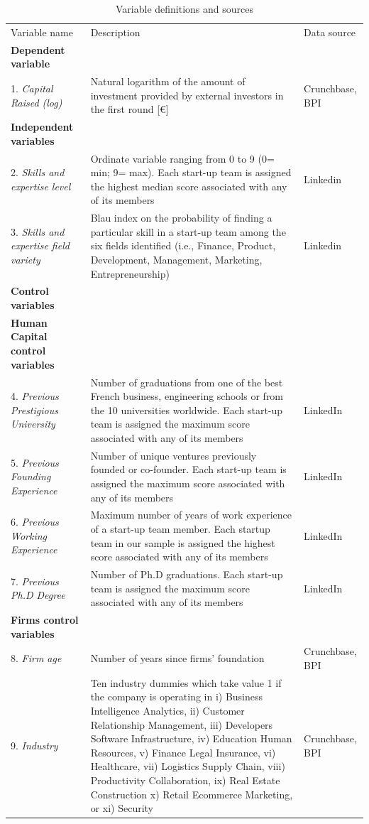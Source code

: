 \documentclass[12pt]{article}
\begin{document}

\begin{table} [ht]
\caption{Variable definitions and sources}
\scriptsize
\renewcommand{\arraystretch}{1.5}
\begin{tabularx}{\textwidth}{ p{5cm} p{7cm} p{2.2cm} }
\toprule
\multicolumn{1}{l}{Variable name}&\multicolumn{1}{l}{Description}&\multicolumn{1}{l}{Data source}\\
\cmidrule(r){1-3}
\textbf{Dependent variable}& &\\
1. \textit{Capital Raised (log)} & Natural logarithm of the amount of investment provided by external investors in the first round [€] & Crunchbase, BPI \\
\textbf{Independent variables}& &\\
2. \textit{Skills and expertise level} & Ordinate variable ranging from 0 to 9 (0= min; 9= max). Each start-up team is assigned the highest median score associated with any of its members & Linkedin\\
3. \textit{Skills and expertise field variety} & Blau index on the probability of finding a particular skill in a start-up team among the six fields identified (i.e., Finance, Product, Development, Management, Marketing, Entrepreneurship) & Linkedin \\
\textbf{Control variables}& &\\
\textbf{Human Capital control variables}& &\\
4. \textit{Previous Prestigious University} & Number of graduations from one of the best French business, engineering schools or from the 10 universities worldwide. Each start-up team is assigned the maximum score associated with any of its members & LinkedIn\\
5. \textit{Previous Founding Experience} & Number of unique ventures previously founded or co-founder. Each start-up team is assigned the maximum score associated with any of its members & LinkedIn\\
6. \textit{Previous Working Experience} & Maximum number of years of work experience of a start-up team member. Each startup team in our sample is assigned the highest score associated with any of its members & LinkedIn\\
7. \textit{Previous Ph.D Degree} & Number of Ph.D graduations. Each start-up team is assigned the maximum score associated with any of its members & LinkedIn\\
\textbf{Firms control variables}& &\\
8. \textit{Firm age} & Number of years since firms' foundation & Crunchbase, BPI\\
9. \textit{Industry} & Ten industry dummies which take value 1 if the company is operating in i) Business Intelligence Analytics, ii) Customer Relationship Management, iii) Developers Software Infrastructure, iv) Education Human Resources, v) Finance Legal Insurance, vi) Healthcare, vii) Logistics Supply Chain, viii) Productivity Collaboration, ix) Real Estate Construction x) Retail Ecommerce Marketing, or xi) Security & Crunchbase, BPI \\
\cmidrule(r){1-3}
\end{tabularx}
\label{table1}
\end{table}
\end{document}
